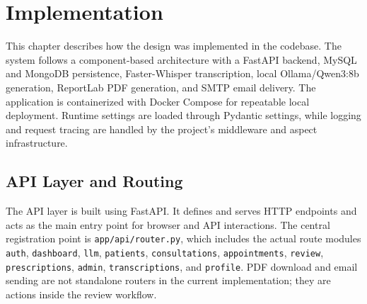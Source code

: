 \section{Implementation}
\label{sec:implementation}

This chapter describes how the design was implemented in the codebase. The system follows a component-based architecture with a FastAPI backend, MySQL and MongoDB persistence, Faster-Whisper transcription, local Ollama/Qwen3:8b generation, ReportLab PDF generation, and SMTP email delivery. The application is containerized with Docker Compose for repeatable local deployment. Runtime settings are loaded through Pydantic settings, while logging and request tracing are handled by the project's middleware and aspect infrastructure.

\subsection{API Layer and Routing}
\label{subsec:api-layer}

The API layer is built using FastAPI. It defines and serves HTTP endpoints and acts as the main entry point for browser and API interactions. The central registration point is \texttt{app/api/router.py}, which includes the actual route modules \texttt{auth}, \texttt{dashboard}, \texttt{llm}, \texttt{patients}, \texttt{consultations}, \texttt{appointments}, \texttt{review}, \texttt{prescriptions}, \texttt{admin}, \texttt{transcriptions}, and \texttt{profile}. PDF download and email sending are not standalone routers in the current implementation; they are actions inside the review workflow.

